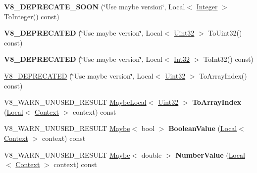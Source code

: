 \begin{DoxyCompactItemize}
\item 
{\bfseries V8\+\_\+\+D\+E\+P\+R\+E\+C\+A\+T\+E\+\_\+\+S\+O\+ON} (\char`\"{}Use maybe version\char`\"{}, Local$<$ \hyperlink{classv8_1_1Integer}{Integer} $>$ To\+Integer() const)\hypertarget{classv8_1_1Value_aaf6d45da85632495545435e44ed2eeab}{}\label{classv8_1_1Value_aaf6d45da85632495545435e44ed2eeab}

\item 
{\bfseries V8\+\_\+\+D\+E\+P\+R\+E\+C\+A\+T\+ED} (\char`\"{}Use maybe version\char`\"{}, Local$<$ \hyperlink{classv8_1_1Uint32}{Uint32} $>$ To\+Uint32() const)\hypertarget{classv8_1_1Value_a266f96f746d6addf7b829a1f0c62b2af}{}\label{classv8_1_1Value_a266f96f746d6addf7b829a1f0c62b2af}

\item 
{\bfseries V8\+\_\+\+D\+E\+P\+R\+E\+C\+A\+T\+ED} (\char`\"{}Use maybe version\char`\"{}, Local$<$ \hyperlink{classv8_1_1Int32}{Int32} $>$ To\+Int32() const)\hypertarget{classv8_1_1Value_a0431dfa7c7236d58949f649802f4a03a}{}\label{classv8_1_1Value_a0431dfa7c7236d58949f649802f4a03a}

\item 
\hyperlink{classv8_1_1Value_adedc431c9a5f9fc875027c773cc26585}{V8\+\_\+\+D\+E\+P\+R\+E\+C\+A\+T\+ED} (\char`\"{}Use maybe version\char`\"{}, Local$<$ \hyperlink{classv8_1_1Uint32}{Uint32} $>$ To\+Array\+Index() const)
\item 
V8\+\_\+\+W\+A\+R\+N\+\_\+\+U\+N\+U\+S\+E\+D\+\_\+\+R\+E\+S\+U\+LT \hyperlink{classv8_1_1MaybeLocal}{Maybe\+Local}$<$ \hyperlink{classv8_1_1Uint32}{Uint32} $>$ {\bfseries To\+Array\+Index} (\hyperlink{classv8_1_1Local}{Local}$<$ \hyperlink{classv8_1_1Context}{Context} $>$ context) const \hypertarget{classv8_1_1Value_abac68de66288d00b3b612c20e5059515}{}\label{classv8_1_1Value_abac68de66288d00b3b612c20e5059515}

\item 
V8\+\_\+\+W\+A\+R\+N\+\_\+\+U\+N\+U\+S\+E\+D\+\_\+\+R\+E\+S\+U\+LT \hyperlink{classv8_1_1Maybe}{Maybe}$<$ bool $>$ {\bfseries Boolean\+Value} (\hyperlink{classv8_1_1Local}{Local}$<$ \hyperlink{classv8_1_1Context}{Context} $>$ context) const \hypertarget{classv8_1_1Value_ae6e855a09c4b60ec2c4674731d0d365c}{}\label{classv8_1_1Value_ae6e855a09c4b60ec2c4674731d0d365c}

\item 
V8\+\_\+\+W\+A\+R\+N\+\_\+\+U\+N\+U\+S\+E\+D\+\_\+\+R\+E\+S\+U\+LT \hyperlink{classv8_1_1Maybe}{Maybe}$<$ double $>$ {\bfseries Number\+Value} (\hyperlink{classv8_1_1Local}{Local}$<$ \hyperlink{classv8_1_1Context}{Context} $>$ context) const \hypertarget{classv8_1_1Value_a3dcd02e3d5ee791e0c42c7f2ebfedbaf}{}\label{classv8_1_1Value_a3dcd02e3d5ee791e0c42c7f2ebfedbaf}


\end{DoxyCompactItemize}

